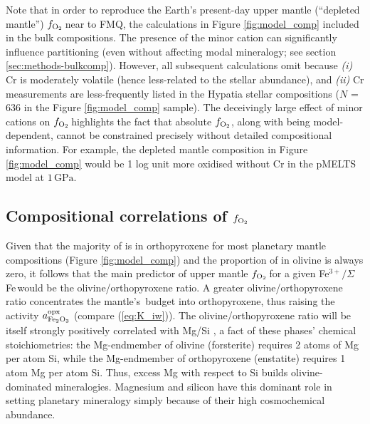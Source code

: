 \documentclass[fleqn,usenatbib,twocolumn]{mnras}
\newcommand{\fo}{$f_{\ce{O2}}$}
\newcommand{\ferric}{\ce{Fe^{3+}}}
\newcommand{\xfer}{Fe$^{3+}/\Sigma$Fe}
\newcommand{\todo}[1]{\textit{\textcolor{violet}{{#1}}}}
\begin{document}
Note that in order to reproduce the Earth's present-day upper mantle (``depleted mantle'') \fo\,near to FMQ, the calculations in Figure \ref{fig:model_comp} included  in the bulk compositions. The presence of the minor cation  can significantly influence  partitioning (even without affecting modal mineralogy; see section \ref{sec:methods-bulkcomp}). However, all subsequent calculations omit  because \textit{(i)} Cr is moderately volatile (hence less-related to the stellar abundance), and \textit{(ii)} Cr measurements are less-frequently listed in the Hypatia stellar compositions ($N$ = 636 in the Figure \ref{fig:model_comp} sample). The deceivingly large effect of minor cations on \fo\,highlights the fact that absolute \fo, along with being model-dependent, cannot be constrained precisely without detailed compositional information. For example, the depleted mantle composition in Figure \ref{fig:model_comp} would be 1 log unit more oxidised without Cr in the pMELTS model at $1\,\text{GPa}$.








\subsection{Compositional correlations of \fo}

Given that the majority of  is in orthopyroxene for most planetary mantle compositions (Figure \ref{fig:model_comp}) and the proportion of  in olivine is always zero, it follows that the main predictor of upper mantle \fo\,for a given \xfer\,would be the olivine/orthopyroxene ratio. A greater olivine/orthopyroxene ratio concentrates the mantle's \ferric\,budget into orthopyroxene, thus raising the activity $a_{\rm Fe_2O_3}^{\rm opx}$ (compare (\ref{eq:K_iw})). The olivine/orthopyroxene ratio will be itself strongly positively correlated with Mg/Si \citep{hinkel_starplanet_2018, spaargaren_plausible_2022, guimond_mantle_2023}, a fact of these phases' chemical stoichiometries: the Mg-endmember of olivine  (forsterite) requires 2 atoms of Mg per atom Si, while the Mg-endmember of orthopyroxene  (enstatite) requires 1 atom Mg per atom Si. Thus, excess Mg with respect to Si builds olivine-dominated mineralogies. Magnesium and silicon have this dominant role in setting planetary mineralogy simply because of their high cosmochemical abundance.
\end{document}
